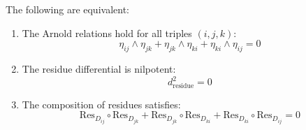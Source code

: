 \begin{theorem}[Arnold relations \texorpdfstring{$\Leftrightarrow$}{iff} \texorpdfstring{$d_{\text{residue}}^2 = 0$}{d\_residue\textasciicircum 2 = 0}; \ClaimStatusProvedHere]\label{thm:arnold-iff-nilpotent}
The following are equivalent:
\begin{enumerate}
\item The Arnold relations hold for all triples $(i,j,k)$:
\[\eta_{ij} \wedge \eta_{jk} + \eta_{jk} \wedge \eta_{ki} + \eta_{ki} \wedge \eta_{ij} = 0\]

\item The residue differential is nilpotent:
\[d_{\text{residue}}^2 = 0\]

\item The composition of residues satisfies:
\[\text{Res}_{D_{ij}} \circ \text{Res}_{D_{jk}} + \text{Res}_{D_{jk}} \circ \text{Res}_{D_{ki}}
+ \text{Res}_{D_{ki}} \circ \text{Res}_{D_{ij}} = 0\]
\end{enumerate}
\end{theorem}

